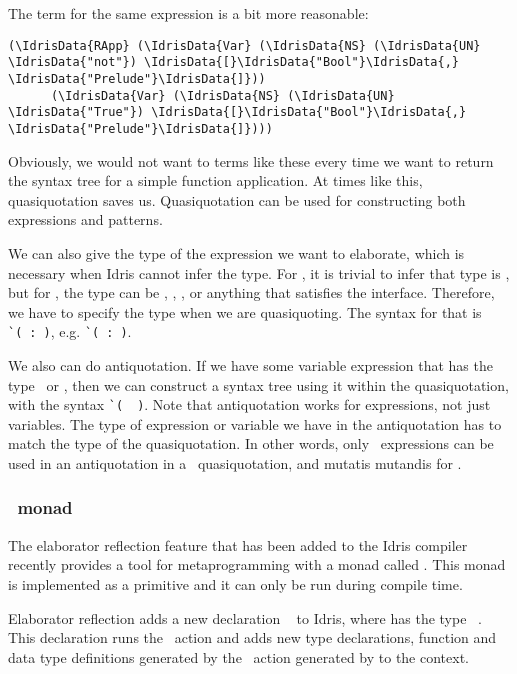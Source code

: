 The  term for the same expression is a bit more reasonable:
\begin{Verbatim}[framesep=2mm, label=\footnotesize{\normalfont{Idris}}, labelposition=topline]
(\IdrisData{RApp} (\IdrisData{Var} (\IdrisData{NS} (\IdrisData{UN} \IdrisData{"not"}) \IdrisData{[}\IdrisData{"Bool"}\IdrisData{,} \IdrisData{"Prelude"}\IdrisData{]}))
      (\IdrisData{Var} (\IdrisData{NS} (\IdrisData{UN} \IdrisData{"True"}) \IdrisData{[}\IdrisData{"Bool"}\IdrisData{,} \IdrisData{"Prelude"}\IdrisData{]})))
\end{Verbatim}

Obviously, we would not want to terms like these every time we want to return
the syntax tree for a simple function application. At times like this,
quasiquotation saves us.
Quasiquotation can be used for constructing both expressions and patterns.

We can also give the type of the expression we want to elaborate, which is
necessary when Idris cannot infer the type. For , it is trivial to
infer that type is , but for , the type can be ,
, , or anything that satisfies the  interface.
Therefore, we have to specify the type when we are quasiquoting. The
syntax for that is \verb|`(|\ \verb|:|\ \verb|)|,
e.g. \verb|`(|\ \verb|:|\ \verb|)|.

We also can do antiquotation. If we have some variable expression  that has the
type \TT\ or , then we can construct a syntax tree using it within the
quasiquotation, with the syntax \verb|`(|\ ~\verb|)|.
Note that antiquotation works for expressions, not just variables. The type of
expression or variable we have in the antiquotation has to match the type of
the quasiquotation. In other words, only \TT\ expressions can be used in an
antiquotation in a \TT\ quasiquotation, and mutatis mutandis for .

\subsubsection{\protect\Elab\ monad}

The elaborator reflection\cite{elabref} feature that has been added to the
Idris compiler recently provides a tool for metaprogramming with a monad called
\Elab.  This monad is implemented as a primitive and it can only be run during
compile time.

Elaborator reflection adds a new declaration
\texttt{}\  to Idris,
where  has the type \ \ty{()}.
This declaration runs the \Elab\ action and adds new type declarations,
function and data type definitions generated by the \Elab\ action generated by
 to the context.

